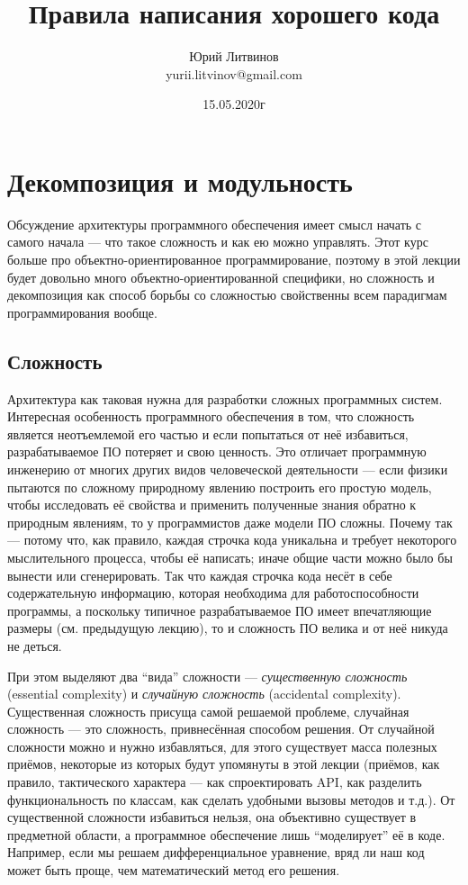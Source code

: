 \documentclass[a5paper]{article}
\title{Правила написания хорошего кода}
\author{Юрий Литвинов\\\small{yurii.litvinov@gmail.com}}
\date{15.05.2020г}
\begin{document}
\maketitle
\thispagestyle{empty}

\section{Декомпозиция и модульность}


Обсуждение архитектуры программного обеспечения имеет смысл начать с самого начала --- что такое сложность и как ею можно управлять. Этот курс больше про объектно-ориентированное программирование, поэтому в этой лекции будет довольно много объектно-ориентированной специфики, но сложность и декомпозиция как способ борьбы со сложностью свойственны всем парадигмам программирования вообще.

\subsection{Сложность}

Архитектура как таковая нужна для разработки сложных программных систем. Интересная особенность программного обеспечения в том, что сложность является неотъемлемой его частью и если попытаться от неё избавиться, разрабатываемое ПО потеряет и свою ценность. Это отличает программную инженерию от многих других видов человеческой деятельности --- если физики пытаются по сложному природному явлению построить его простую модель, чтобы исследовать её свойства и применить полученные знания обратно к природным явлениям, то у программистов даже модели ПО сложны. Почему так --- потому что, как правило, каждая строчка кода уникальна и требует некоторого мыслительного процесса, чтобы её написать; иначе общие части можно было бы вынести или сгенерировать. Так что каждая строчка кода несёт в себе содержательную информацию, которая необходима для работоспособности программы, а поскольку типичное разрабатываемое ПО имеет впечатляющие размеры (см. предыдущую лекцию), то и сложность ПО велика и от неё никуда не деться.

При этом выделяют два ``вида'' сложности --- \textit{существенную сложность} (essential complexity) и \textit{случайную сложность} (accidental complexity). Существенная сложность присуща самой решаемой проблеме, случайная сложность --- это сложность, привнесённая способом решения. От случайной сложности можно и нужно избавляться, для этого существует масса полезных приёмов, некоторые из которых будут упомянуты в этой лекции (приёмов, как правило, тактического характера --- как спроектировать API, как разделить функциональность по классам, как сделать удобными вызовы методов и т.д.). От существенной сложности избавиться нельзя, она объективно существует в предметной области, а программное обеспечение лишь ``моделирует'' её в коде. Например, если мы решаем дифференциальное уравнение, вряд ли наш код может быть проще, чем математический метод его решения.
\end{document}
